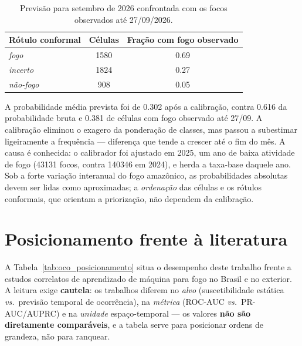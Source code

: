 \begin{table}[h]
\centering
\caption{Previsão para setembro de 2026 confrontada com os focos observados até 27/09/2026.}
\label{tab:oco_forecast}
\small
\begin{tabular}{lcc}
\toprule
\textbf{Rótulo conformal} & \textbf{Células} & \textbf{Fração com fogo observado} \\
\midrule
\emph{fogo}     & \num{1580} & \num{0,69} \\
\emph{incerto}  & \num{1824} & \num{0,27} \\
\emph{não-fogo} & \num{908}  & \num{0,05} \\
\bottomrule
\end{tabular}
\end{table}

A probabilidade média prevista foi de \num{0,302} após a calibração, contra \num{0,616} da probabilidade bruta e \num{0,381} de células com fogo observado até 27/09. A calibração eliminou o exagero da ponderação de classes, mas passou a subestimar ligeiramente a frequência --- diferença que tende a crescer até o fim do mês. A causa é conhecida: o calibrador foi ajustado em 2025, um ano de baixa atividade de fogo (\num{43131} focos, contra \num{140346} em 2024), e herda a taxa-base daquele ano. Sob a forte variação interanual do fogo amazônico, as probabilidades absolutas devem ser lidas como aproximadas; a \emph{ordenação} das células e os rótulos conformais, que orientam a priorização, não dependem da calibração.

\section{Posicionamento frente à literatura}
\label{sec:oco_posicionamento}

A Tabela~\ref{tab:oco_posicionamento} situa o desempenho deste trabalho frente a estudos
correlatos de aprendizado de máquina para fogo no Brasil e no exterior. A leitura exige
\textbf{cautela}: os trabalhos diferem no \emph{alvo} (suscetibilidade estática \emph{vs.}\
previsão temporal de ocorrência), na \emph{métrica} (ROC-AUC \emph{vs.}\ PR-AUC/AUPRC) e na
\emph{unidade} espaço-temporal --- os valores \textbf{não são diretamente comparáveis}, e a
tabela serve para posicionar ordens de grandeza, não para ranquear.

